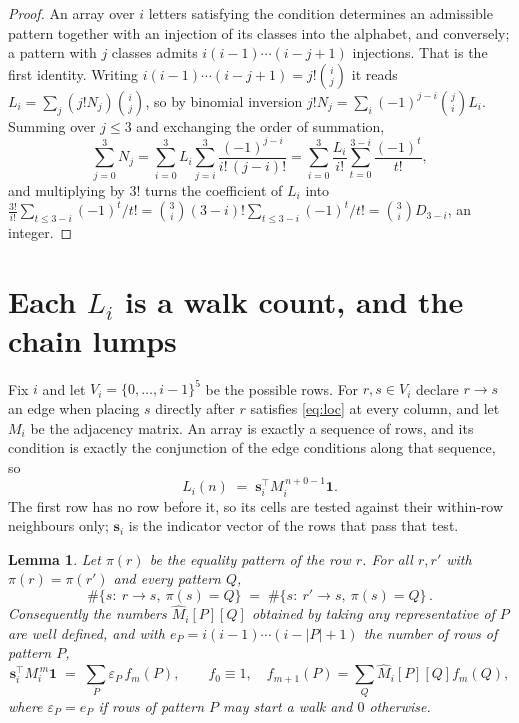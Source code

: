 \documentclass[11pt,a4paper]{article}
\theoremstyle{plain}
\newtheorem{lemma}[theorem]{Lemma}
\theoremstyle{definition}
\begin{document}
\begin{proof}
An array over $i$ letters satisfying the condition determines an admissible pattern together
with an injection of its classes into the alphabet, and conversely; a pattern with $j$
classes admits $i(i-1)\cdots(i-j+1)$ injections. That is the first identity. Writing
$i(i-1)\cdots(i-j+1)=j!\binom{i}{j}$ it reads $L_i=\sum_j (j!N_j)\binom{i}{j}$, so by
binomial inversion $j!N_j=\sum_{i}(-1)^{j-i}\binom{j}{i}L_i$. Summing over
$j\le 3$ and exchanging the order of summation,
\[
\sum_{j=0}^{3}N_j=\sum_{i=0}^{3}L_i\sum_{j=i}^{3}\frac{(-1)^{j-i}}{i!\,(j-i)!}
=\sum_{i=0}^{3}\frac{L_i}{i!}\sum_{t=0}^{3-i}\frac{(-1)^t}{t!} ,
\]
and multiplying by $3!$ turns the coefficient of $L_i$ into
$\frac{3!}{i!}\sum_{t\le 3-i}(-1)^t/t!=\binom{3}{i}(3-i)!\sum_{t\le 3-i}(-1)^t/t!
=\binom{3}{i}D_{3-i}$, an integer.
\end{proof}

\section{Each $L_i$ is a walk count, and the chain lumps}

Fix $i$ and let $V_i=\{0,\dots,i-1\}^{5}$ be the possible rows. For $r,s\in V_i$
declare $r\to s$ an edge when placing $s$ directly after $r$ satisfies \eqref{eq:loc} at
every column, and let $M_i$ be the adjacency matrix. An array is exactly a sequence of
rows, and its condition is exactly the conjunction of the edge conditions along that
sequence, so
\[
L_i(n)\;=\;\mathbf{s}_i^{\!\top}M_i^{\,n+0-1}\mathbf{1} .
\]
The first row has no row before it, so its cells are tested
against their within-row neighbours only; $\mathbf{s}_i$ is the indicator vector of the
rows that pass that test.

\begin{lemma}\label{lem:lump}
Let $\pi(r)$ be the equality pattern of the row $r$. For all $r,r'$ with
$\pi(r)=\pi(r')$ and every pattern $Q$,
\[
\#\{s:\ r\to s,\ \pi(s)=Q\}\;=\;\#\{s:\ r'\to s,\ \pi(s)=Q\}\, .
\]
Consequently the numbers $\widehat M_i[P][Q]$ obtained by taking any representative of $P$
are well defined, and with $e_P=i(i-1)\cdots(i-|P|+1)$ the number of rows of pattern $P$,
\[
\mathbf{s}_i^{\!\top}M_i^{\,m}\mathbf{1}\;=\;\sum_P \varepsilon_P\,f_m(P),
\qquad f_0\equiv1,\quad f_{m+1}(P)=\sum_Q\widehat M_i[P][Q]f_m(Q),
\]
where $\varepsilon_P=e_P$ if rows of pattern $P$ may start a walk and $0$ otherwise.
\end{lemma}
\end{document}
